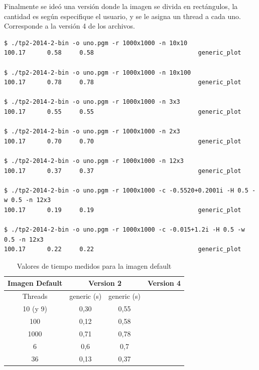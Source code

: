 \documentclass[a4paper,10pt]{article}
\begin{document}
Finalmente se ideó una versión donde la imagen se divida en rectángulos, la cantidad es según especifique el usuario, y se le asigna un thread a cada uno.
Corresponde a la versión 4 de los archivos.

\begin{verbatim}
$ ./tp2-2014-2-bin -o uno.pgm -r 1000x1000 -n 10x10
100.17      0.58     0.58                             generic_plot

$ ./tp2-2014-2-bin -o uno.pgm -r 1000x1000 -n 10x100
100.17      0.78     0.78                             generic_plot

$ ./tp2-2014-2-bin -o uno.pgm -r 1000x1000 -n 3x3
100.17      0.55     0.55                             generic_plot

$ ./tp2-2014-2-bin -o uno.pgm -r 1000x1000 -n 2x3
100.17      0.70     0.70                             generic_plot

$ ./tp2-2014-2-bin -o uno.pgm -r 1000x1000 -n 12x3
100.17      0.37     0.37                             generic_plot

$ ./tp2-2014-2-bin -o uno.pgm -r 1000x1000 -c -0.5520+0.2001i -H 0.5 -w 0.5 -n 12x3
100.17      0.19     0.19                             generic_plot

$ ./tp2-2014-2-bin -o uno.pgm -r 1000x1000 -c -0.015+1.2i -H 0.5 -w 0.5 -n 12x3
100.17      0.22     0.22                             generic_plot
\end{verbatim}

\begin{table} [htbHp]
\begin{center}
\begin{tabular}{|c|c|c|c|c|}\hline
Imagen Default	&\multicolumn{2}{c|}{Version 2}&\multicolumn{2}{c|}{Version 4}\\\hline
Threads	&generic (s)	&generic (s) \\\hline
10 (y 9)  &0,30	&0,55\\\hline
100  &0,12  & 0,58 \\\hline
1000  &0,71	& 0,78 \\\hline
6 & 0,6  &0,7 \\\hline
36	& 0,13 &0,37﻿ \\\hline
\end{tabular}
\end{center}
\caption{Valores de tiempo medidos para la imagen default}
\end{table}
\end{document}
